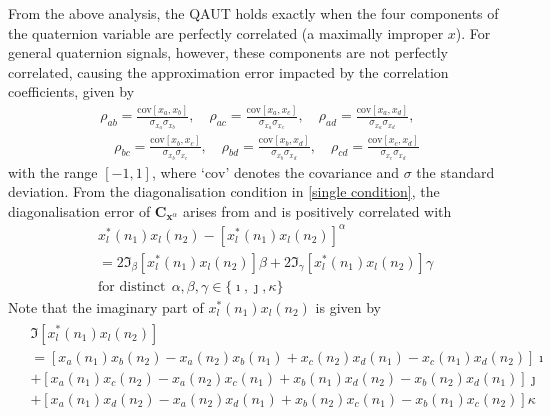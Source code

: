 \documentclass[review]{elsarticle}
\theoremstyle{plain}
\theoremstyle{remark}
\theoremstyle{plain}
\theoremstyle{definition}
\theoremstyle{prop}
\theoremstyle{definition}
\theoremstyle{plain}
\theoremstyle{plain}
\def \C {\mathbf{C}}
\def \x {\mathbf{x}}
\begin{document}
From the above analysis, the QAUT holds exactly when
the four components
of the quaternion variable are perfectly correlated (a maximally improper $x$). For general quaternion signals, however, these components are not perfectly correlated, causing the approximation error impacted by the correlation coefficients, given by
\begin{align*}
\rho_{ab}=\frac{\textrm{cov}[x_{a},x_{b}]}{\sigma_{x_{a}}\sigma_{x_{b}}},\quad\rho_{ac}=\frac{\textrm{cov}[x_{a},x_{c}]}{\sigma_{x_{a}}\sigma_{x_{c}}},\quad\rho_{ad}=\frac{\textrm{cov}[x_{a},x_{d}]}{\sigma_{x_{a}}\sigma_{x_{d}}},
\\\!\!\!\!\!\quad\rho_{bc}=\frac{\textrm{cov}[x_{b},x_{c}]}{\sigma_{x_{b}}\sigma_{x_{c}}},\quad\rho_{bd}=\frac{\textrm{cov}[x_{b},x_{d}]}{\sigma_{x_{b}}\sigma_{x_{d}}},\quad\rho_{cd}=\frac{\textrm{cov}[x_{c},x_{d}]}{\sigma_{x_{c}}\sigma_{x_{d}}}
\end{align*}
with the range $[-1,1]$, where `$\textrm{cov}$' denotes the covariance and $\sigma$ the standard deviation.
From the diagonalisation condition in \eqref{single condition}, the diagonalisation error of $\C_{\x^\alpha}$ arises from and is positively correlated with
\begin{equation}\label{error}
\begin{split}
&x^{*}_l\left(n_1\right)x_l\left(n_2\right)-\left[x^{*}_l\left(n_1\right)x_l\left(n_2\right)\right]^\alpha
\\&=2\mathfrak{I}_\beta\left[x_l^{*}\left(n_1\right)x_l\left(n_2\right)\right]\beta+2\mathfrak{I}_\gamma\left[x_l^{*}\left(n_1\right)x_l\left(n_2\right)\right]\gamma
\\&\text{for distinct}~~\alpha,\beta,\gamma \in \{\imath,\jmath,\kappa\}\end{split}
\end{equation}
Note that the imaginary part of $x_l^{*}\left(n_1\right)x_l\left(n_2\right)$ is given by
\begin{align}\label{Im}
\begin{array}{rl}
&\mathfrak{I}\left[x_l^{*}\left(n_1\right)x_l\left(n_2\right)\right]\\&=\!\!\left[x_{a}\left(n_1\right)x_{b}\left(n_2\right)-x_{a}\left(n_2\right)x_{b}\left(n_1\right)+x_{c}\left(n_2\right)x_{d}\left(n_1\right)-x_{c}\left(n_1\right)x_{d}\left(n_2\right)\right]\imath\\&+\left[x_{a}\left(n_1\right)x_{c}\left(n_2\right)-x_{a}\left(n_2\right)x_{c}\left(n_1\right)+x_{b}\left(n_1\right)x_{d}\left(n_2\right)-x_{b}\left(n_2\right)x_{d}\left(n_1\right)\right]\jmath\\&+\left[x_{a}\left(n_1\right)x_{d}\left(n_2\right)-x_{a}\left(n_2\right)x_{d}\left(n_1\right)+x_{b}\left(n_2\right)x_{c}\left(n_1\right)-x_{b}\left(n_1\right)x_{c}\left(n_2\right)\right]\kappa
\end{array}
\end{align}
\end{document}
